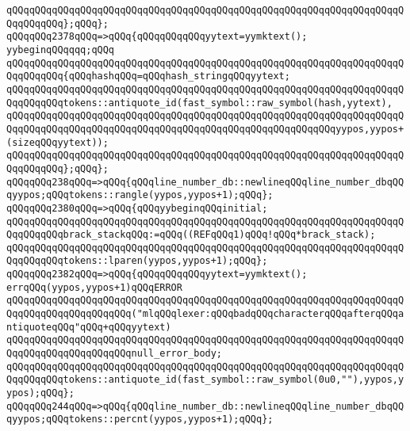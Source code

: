 \verb|qQQqqQQqqQQqqQQqqQQqqQQqqQQqqQQqqQQqqQQqqQQqqQQqqQQqqQQqqQQqqQQqqQQqqQQqqQQqqQQq};qQQq};|\newline
\verb|qQQqqQQq2378qQQq=>qQQq{qQQqqQQqqQQqyytext=yymktext();|\newline
\verb|yybeginqQQqqqq;qQQq|\newline
\verb|qQQqqQQqqQQqqQQqqQQqqQQqqQQqqQQqqQQqqQQqqQQqqQQqqQQqqQQqqQQqqQQqqQQqqQQqqQQqqQQq{qQQqhashqQQq=qQQqhash_stringqQQqyytext;|\newline
\newline
\verb|qQQqqQQqqQQqqQQqqQQqqQQqqQQqqQQqqQQqqQQqqQQqqQQqqQQqqQQqqQQqqQQqqQQqqQQqqQQqqQQqtokens::antiquote_id(fast_symbol::raw_symbol(hash,yytext),|\newline
\verb|qQQqqQQqqQQqqQQqqQQqqQQqqQQqqQQqqQQqqQQqqQQqqQQqqQQqqQQqqQQqqQQqqQQqqQQqqQQqqQQqqQQqqQQqqQQqqQQqqQQqqQQqqQQqqQQqqQQqqQQqqQQqqQQqyypos,yypos+(sizeqQQqyytext));|\newline
\verb|qQQqqQQqqQQqqQQqqQQqqQQqqQQqqQQqqQQqqQQqqQQqqQQqqQQqqQQqqQQqqQQqqQQqqQQqqQQqqQQq};qQQq};|\newline
\verb|qQQqqQQq238qQQq=>qQQq{qQQqline_number_db::newlineqQQqline_number_dbqQQqyypos;qQQqtokens::rangle(yypos,yypos+1);qQQq};|\newline
\verb|qQQqqQQq2380qQQq=>qQQq{qQQqyybeginqQQqinitial;|\newline
\verb|qQQqqQQqqQQqqQQqqQQqqQQqqQQqqQQqqQQqqQQqqQQqqQQqqQQqqQQqqQQqqQQqqQQqqQQqqQQqqQQqbrack_stackqQQq:=qQQq((REFqQQq1)qQQq!qQQq*brack_stack);|\newline
\verb|qQQqqQQqqQQqqQQqqQQqqQQqqQQqqQQqqQQqqQQqqQQqqQQqqQQqqQQqqQQqqQQqqQQqqQQqqQQqqQQqtokens::lparen(yypos,yypos+1);qQQq};|\newline
\verb|qQQqqQQq2382qQQq=>qQQq{qQQqqQQqqQQqyytext=yymktext();|\newline
\verb|errqQQq(yypos,yypos+1)qQQqERROR|\newline
\verb|qQQqqQQqqQQqqQQqqQQqqQQqqQQqqQQqqQQqqQQqqQQqqQQqqQQqqQQqqQQqqQQqqQQqqQQqqQQqqQQqqQQqqQQqqQQq("mlqQQqlexer:qQQqbadqQQqcharacterqQQqafterqQQqantiquoteqQQq"qQQq+qQQqyytext)|\newline
\verb|qQQqqQQqqQQqqQQqqQQqqQQqqQQqqQQqqQQqqQQqqQQqqQQqqQQqqQQqqQQqqQQqqQQqqQQqqQQqqQQqqQQqqQQqqQQqnull_error_body;|\newline
\verb|qQQqqQQqqQQqqQQqqQQqqQQqqQQqqQQqqQQqqQQqqQQqqQQqqQQqqQQqqQQqqQQqqQQqqQQqqQQqqQQqtokens::antiquote_id(fast_symbol::raw_symbol(0u0,""),yypos,yypos);qQQq};|\newline
\verb|qQQqqQQq244qQQq=>qQQq{qQQqline_number_db::newlineqQQqline_number_dbqQQqyypos;qQQqtokens::percnt(yypos,yypos+1);qQQq};|\newline
